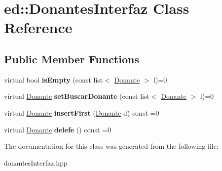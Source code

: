 \hypertarget{classed_1_1DonantesInterfaz}{}\section{ed\+:\+:Donantes\+Interfaz Class Reference}
\label{classed_1_1DonantesInterfaz}
\subsection*{Public Member Functions}
\begin{DoxyCompactItemize}
\item 
\hypertarget{classed_1_1DonantesInterfaz_a7317fba15beb0e925791249ea029ff7c}{}virtual bool {\bfseries is\+Empty} (const list$<$ \hyperlink{classed_1_1Donante}{Donante} $>$ l)=0\label{classed_1_1DonantesInterfaz_a7317fba15beb0e925791249ea029ff7c}

\item 
\hypertarget{classed_1_1DonantesInterfaz_a7e2bcffe281d11fe109d0606fbc739ac}{}virtual \hyperlink{classed_1_1Donante}{Donante} {\bfseries set\+Buscar\+Donante} (const list$<$ \hyperlink{classed_1_1Donante}{Donante} $>$ l)=0\label{classed_1_1DonantesInterfaz_a7e2bcffe281d11fe109d0606fbc739ac}

\item 
\hypertarget{classed_1_1DonantesInterfaz_ac2f865429880fad7998bea01d5cd1c18}{}virtual \hyperlink{classed_1_1Donante}{Donante} {\bfseries insert\+First} (\hyperlink{classed_1_1Donante}{Donante} d) const =0\label{classed_1_1DonantesInterfaz_ac2f865429880fad7998bea01d5cd1c18}

\item 
\hypertarget{classed_1_1DonantesInterfaz_a4f16062b3c1b6f11653a438f8f800a81}{}virtual \hyperlink{classed_1_1Donante}{Donante} {\bfseries delefe} () const =0\label{classed_1_1DonantesInterfaz_a4f16062b3c1b6f11653a438f8f800a81}

\end{DoxyCompactItemize}


The documentation for this class was generated from the following file\+:\begin{DoxyCompactItemize}
\item 
donantes\+Interfaz.\+hpp\end{DoxyCompactItemize}
